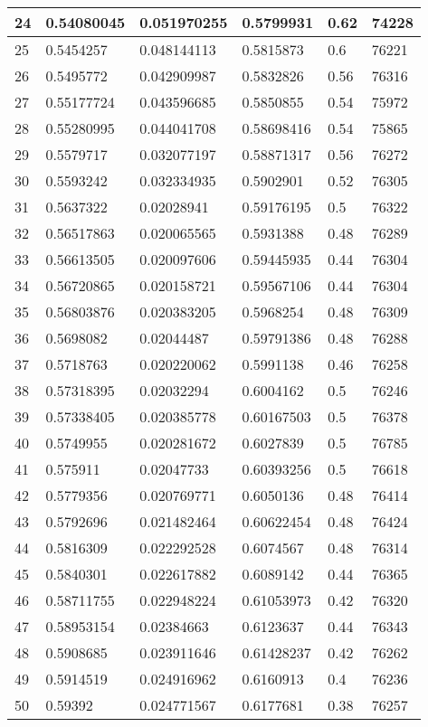 \begin{longtable}{|l|l|l|l|l|l|}
24 & 0.54080045 & 0.051970255 & 0.5799931 & 0.62 & 74228 \\ \hline 
25 & 0.5454257 & 0.048144113 & 0.5815873 & 0.6 & 76221 \\ \hline 
26 & 0.5495772 & 0.042909987 & 0.5832826 & 0.56 & 76316 \\ \hline 
27 & 0.55177724 & 0.043596685 & 0.5850855 & 0.54 & 75972 \\ \hline 
28 & 0.55280995 & 0.044041708 & 0.58698416 & 0.54 & 75865 \\ \hline 
29 & 0.5579717 & 0.032077197 & 0.58871317 & 0.56 & 76272 \\ \hline 
30 & 0.5593242 & 0.032334935 & 0.5902901 & 0.52 & 76305 \\ \hline 
31 & 0.5637322 & 0.02028941 & 0.59176195 & 0.5 & 76322 \\ \hline 
32 & 0.56517863 & 0.020065565 & 0.5931388 & 0.48 & 76289 \\ \hline 
33 & 0.56613505 & 0.020097606 & 0.59445935 & 0.44 & 76304 \\ \hline 
34 & 0.56720865 & 0.020158721 & 0.59567106 & 0.44 & 76304 \\ \hline 
35 & 0.56803876 & 0.020383205 & 0.5968254 & 0.48 & 76309 \\ \hline 
36 & 0.5698082 & 0.02044487 & 0.59791386 & 0.48 & 76288 \\ \hline 
37 & 0.5718763 & 0.020220062 & 0.5991138 & 0.46 & 76258 \\ \hline 
38 & 0.57318395 & 0.02032294 & 0.6004162 & 0.5 & 76246 \\ \hline 
39 & 0.57338405 & 0.020385778 & 0.60167503 & 0.5 & 76378 \\ \hline 
40 & 0.5749955 & 0.020281672 & 0.6027839 & 0.5 & 76785 \\ \hline 
41 & 0.575911 & 0.02047733 & 0.60393256 & 0.5 & 76618 \\ \hline 
42 & 0.5779356 & 0.020769771 & 0.6050136 & 0.48 & 76414 \\ \hline 
43 & 0.5792696 & 0.021482464 & 0.60622454 & 0.48 & 76424 \\ \hline 
44 & 0.5816309 & 0.022292528 & 0.6074567 & 0.48 & 76314 \\ \hline 
45 & 0.5840301 & 0.022617882 & 0.6089142 & 0.44 & 76365 \\ \hline 
46 & 0.58711755 & 0.022948224 & 0.61053973 & 0.42 & 76320 \\ \hline 
47 & 0.58953154 & 0.02384663 & 0.6123637 & 0.44 & 76343 \\ \hline 
48 & 0.5908685 & 0.023911646 & 0.61428237 & 0.42 & 76262 \\ \hline 
49 & 0.5914519 & 0.024916962 & 0.6160913 & 0.4 & 76236 \\ \hline 
50 & 0.59392 & 0.024771567 & 0.6177681 & 0.38 & 76257 \\ \hline 
\end{longtable}